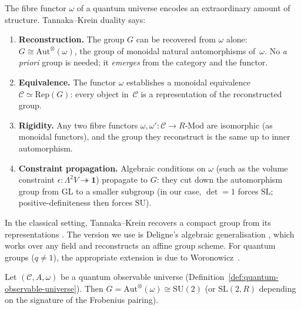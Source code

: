 \begin{remark}
\label{rem:tannaka-krein-overview}
The fibre functor $\omega$ of a quantum universe encodes an extraordinary
amount of structure.  Tannaka--Krein duality \cite{deligne1990} says:
\begin{enumerate}
  \item \textbf{Reconstruction.}\; The group $G$ can be recovered from
        $\omega$ alone:
        $G \cong \mathrm{Aut}^{\otimes}(\omega)$,
        the group of monoidal natural automorphisms of~$\omega$.
        No \emph{a priori} group is needed; it \emph{emerges} from the
        category and the functor.
  \item \textbf{Equivalence.}\; The functor $\omega$ establishes a
        monoidal equivalence
        $\mathcal{C} \simeq \mathrm{Rep}(G)$:
        every object in~$\mathcal{C}$ is a representation of the
        reconstructed group.
  \item \textbf{Rigidity.}\; Any two fibre functors
        $\omega, \omega' \colon \mathcal{C} \to R\text{-}\mathrm{Mod}$
        are isomorphic (as monoidal functors), and the group they
        reconstruct is the same up to inner automorphism.
  \item \textbf{Constraint propagation.}\; Algebraic conditions on
        $\omega$ (such as the volume constraint
        $\epsilon \colon \Lambda^2 V \twoheadrightarrow \mathbf{1}$)
        propagate to $G$: they cut down the automorphism group from
        $\mathrm{GL}$ to a smaller subgroup (in our case, $\det = 1$
        forces $\mathrm{SL}$; positive-definiteness then forces $\mathrm{SU}$).
\end{enumerate}
In the classical setting, Tannaka--Krein recovers a compact group from
its representations \cite{tannaka1939}.  The version we use is
Deligne's algebraic generalisation \cite{deligne1990}, which works
over any field and reconstructs an affine group scheme.  For quantum
groups ($q \neq 1$), the appropriate extension is due to
Woronowicz~\cite{woronowicz1988}.
\end{remark}

\begin{theorem}
\label{thm:su2-emergence}
Let $(\mathcal{C}, A, \omega)$ be a quantum observable universe
(Definition~\ref{def:quantum-observable-universe}).  Then
$G = \mathrm{Aut}^{\otimes}(\omega) \cong \mathrm{SU}(2)$
(or $\mathrm{SL}(2, R)$ depending on the signature of the Frobenius
pairing).
\end{theorem}

